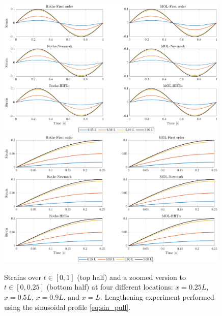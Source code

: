 \documentclass{sfuthesis}
\numberwithin{equation}{section}
\numberwithin{figure}{chapter}
\numberwithin{table}{chapter}
\theoremstyle{definition}
\begin{document}
\begin{figure}
    \centering
    \includegraphics[width=0.99\textwidth]{nh_sin_disp_1.eps}
    \includegraphics[width=0.99\textwidth]{nh_sin_disp_2.eps}
    \caption{Strains over $t \in [0,1]$ (top half) and a zoomed version to $t \in [0,0.25]$ (bottom half) at four different locations: $x = 0.25L$, $x=0.5L$, $x=0.9L$, and $x=L$. Lengthening experiment performed using the sinusoidal profile \eqref{eq:sin_pull}.
    \label{fig:sin_pull_disp}}
\end{figure}
\end{document}
